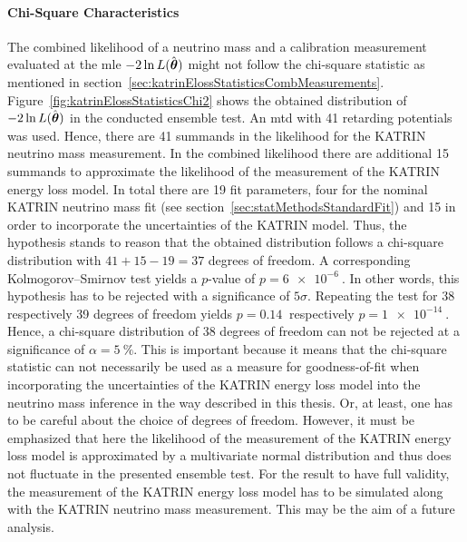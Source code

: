 \paragraph{Chi-Square Characteristics}
The combined likelihood of a neutrino mass and a calibration measurement evaluated at the \gls{mle} $-2\ln L(\hat{\boldsymbol{\mathbf{\theta}}})$ might not follow the chi-square statistic as mentioned in section~\ref{sec:katrinElossStatisticsCombMeasurements}. Figure~\ref{fig:katrinElossStatisticsChi2} shows the obtained distribution of $-2\ln L(\hat{\boldsymbol{\mathbf{\theta}}})$ in the conducted ensemble test. An \gls{mtd} with 41 retarding potentials was used. Hence, there are 41 summands in the likelihood for the KATRIN neutrino mass measurement. In the combined likelihood there are additional 15 summands to approximate the likelihood of the measurement of the KATRIN energy loss model. In total there are 19 fit parameters, four for the nominal KATRIN neutrino mass fit (see section~\ref{sec:statMethodsStandardFit}) and 15 in order to incorporate the uncertainties of the KATRIN model. Thus, the hypothesis stands to reason that the obtained distribution follows a chi-square distribution with $41+15-19=37$ degrees of freedom. A corresponding Kolmogorov–Smirnov test yields a $p$-value of $p=\SI{6e-6}{}$. In other words, this hypothesis has to be rejected with a significance of $5\sigma$. Repeating the test for 38 respectively 39 degrees of freedom yields $p=\SI{0.14}{}$ respectively $p=\SI{1e-14}{}$. Hence, a chi-square distribution of 38 degrees of freedom can not be rejected at a significance of $\alpha=\SI{5}{\percent}$. This is important because it means that the chi-square statistic can not necessarily be used as a measure for goodness-of-fit when incorporating the uncertainties of the KATRIN energy loss model into the neutrino mass inference in the way described in this thesis. Or, at least, one has to be careful about the choice of degrees of freedom. However, it must be emphasized that here the likelihood of the measurement of the KATRIN energy loss model is approximated by a multivariate normal distribution and thus does not fluctuate in the presented ensemble test. For the result to have full validity, the measurement of the KATRIN energy loss model has to be simulated along with the KATRIN neutrino mass measurement. This may be the aim of a future analysis.

